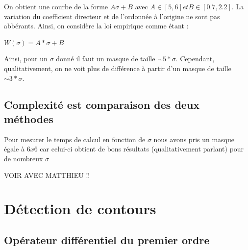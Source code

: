 \documentclass[paper=a4, fontsize=11pt]{scrartcl} %
\begin{document}
On obtient une courbe de la forme $A\sigma + B$ avec $A \in [5,6] et B\in[0.7,2.2]$. La variation du coefficient directeur et de l'ordonnée à l'origine ne sont pas abbérants.
Ainsi, on considère la loi empirique comme étant : 
\begin{center}
$W(\sigma) = A*\sigma+B$
\end{center}

Ainsi, pour un $\sigma$ donné il faut un masque de taille $\sim 5*\sigma$. Cependant, qualitativement, on ne voit plus de différence à partir d'un masque de taille $\sim 3*\sigma$. 


\subsection{Complexité est comparaison des deux méthodes}
Pour mesurer le temps de calcul en fonction de $\sigma$ nous avons pris un masque égale à $6x6$ car celui-ci obtient de bons résultats (qualitativement parlant) pour de nombreux $\sigma$

VOIR AVEC MATTHIEU !!

\section{Détection de contours}

\subsection{Opérateur différentiel du premier ordre}
\end{document}
